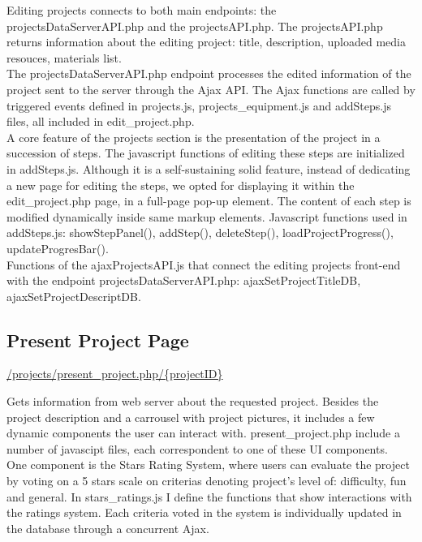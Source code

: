 Editing projects connects to both main endpoints: the projectsDataServerAPI.php and the projectsAPI.php. The projectsAPI.php returns information about the editing project: title, description, uploaded media resouces, materials list. \\	

The projectsDataServerAPI.php endpoint processes the edited information of the project sent to the server through the Ajax API. The Ajax functions are called by triggered events defined in projects.js, projects\_equipment.js and addSteps.js files, all included in edit\_project.php.\\

A core feature of the projects section is the presentation of the project in a succession of steps. The javascript functions of editing these steps are initialized in addSteps.js.
Although it is a self-sustaining solid feature, instead of dedicating a new page for editing the steps, we opted for displaying it within the edit\_project.php page, in a full-page pop-up element. The content of each step is modified dynamically inside same markup elements. Javascript functions used in addSteps.js: showStepPanel(), addStep(), deleteStep(), loadProjectProgress(), updateProgresBar().\\

Functions of the ajaxProjectsAPI.js that connect the editing projects front-end with the endpoint projectsDataServerAPI.php:  ajaxSetProjectTitleDB, ajaxSetProjectDescriptDB. 

 \subsection{Present Project Page}
\url{/projects/present\_project.php/{projectID}}	

Gets information from web server about the requested project.
Besides the project description and a carrousel with project pictures, it includes a few dynamic components the user can interact with. present\_project.php include a number of javascipt files, each correspondent to one of these UI components.\\

One component is the Stars Rating System, where users can evaluate the project by voting on a 5 stars scale on criterias denoting project's level of: difficulty, fun and general. In stars\_ratings.js I define the functions that show interactions with the ratings system. Each criteria voted in the system is individually updated in the database through a concurrent Ajax.\\

